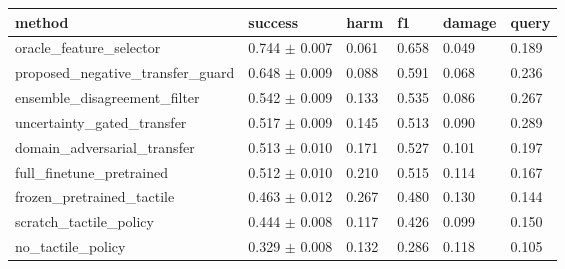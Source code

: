 \begin{tabular}{llllll}
\toprule
method & success & harm & f1 & damage & query \\
\midrule
oracle\_feature\_selector & 0.744 $\pm$ 0.007 & 0.061 & 0.658 & 0.049 & 0.189 \\
proposed\_negative\_transfer\_guard & 0.648 $\pm$ 0.009 & 0.088 & 0.591 & 0.068 & 0.236 \\
ensemble\_disagreement\_filter & 0.542 $\pm$ 0.009 & 0.133 & 0.535 & 0.086 & 0.267 \\
uncertainty\_gated\_transfer & 0.517 $\pm$ 0.009 & 0.145 & 0.513 & 0.090 & 0.289 \\
domain\_adversarial\_transfer & 0.513 $\pm$ 0.010 & 0.171 & 0.527 & 0.101 & 0.197 \\
full\_finetune\_pretrained & 0.512 $\pm$ 0.010 & 0.210 & 0.515 & 0.114 & 0.167 \\
frozen\_pretrained\_tactile & 0.463 $\pm$ 0.012 & 0.267 & 0.480 & 0.130 & 0.144 \\
scratch\_tactile\_policy & 0.444 $\pm$ 0.008 & 0.117 & 0.426 & 0.099 & 0.150 \\
no\_tactile\_policy & 0.329 $\pm$ 0.008 & 0.132 & 0.286 & 0.118 & 0.105 \\
\bottomrule
\end{tabular}
